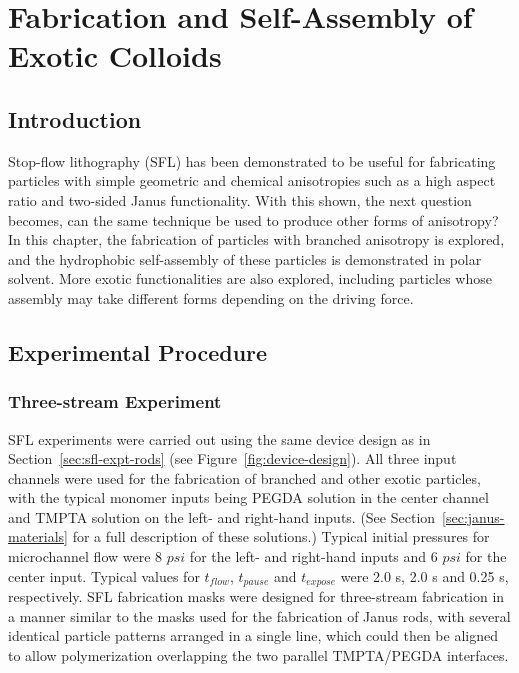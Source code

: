 \chapter{Fabrication and Self-Assembly of Exotic Colloids}
\label{ch:exotic}

\section{Introduction}

Stop-flow lithography (SFL) has been demonstrated to be useful for fabricating particles with 
simple geometric and chemical anisotropies such as a high aspect ratio and 
two-sided Janus functionality.
With this shown, the next question becomes, can the same technique be used to produce other forms of 
anisotropy?  In this chapter, the fabrication of particles with branched anisotropy is explored, and 
the hydrophobic self-assembly of these particles is demonstrated in polar solvent.  More exotic 
functionalities are also explored, including particles whose assembly may take different forms 
depending on the driving force.


\section{Experimental Procedure}
\label{sec:SFLx3}

\subsection{Three-stream Experiment}


SFL experiments were carried out using the same device design as in Section~\ref{sec:sfl-expt-rods} 
(see Figure~\ref{fig:device-design}).  All three input channels were used for the fabrication of 
branched and other exotic particles, with the typical monomer inputs being PEGDA solution in
the center channel and TMPTA solution on the left- and right-hand inputs. (See 
Section~\ref{sec:janus-materials} for a full description of these solutions.) 
Typical initial pressures for microchannel
flow were 8 $psi$ for the left- and right-hand inputs and 6 $psi$ for
the center input. Typical values for $t_{flow}$, $t_{pause}$ and $t_{expose}$ were 2.0 s, 2.0 s and 0.25 s, 
respectively.  SFL fabrication masks were designed for three-stream fabrication in a manner similar to 
the masks used for the fabrication of Janus rods, with several identical particle patterns arranged
in a single line, which could then be aligned to allow polymerization overlapping the 
two parallel TMPTA/PEGDA interfaces.

